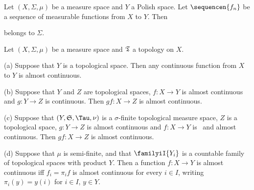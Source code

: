  Let $(X,\Sigma,\mu)$ be a measure space and
$Y$ a Polish space.   Let $\sequencen{f_n}$ be a
sequence of measurable functions from $X$ to $Y$.   Then


\noindent belongs to $\Sigma$.


 Let $(X,\Sigma,\mu)$ be a measure space and
$\frak T$ a topology on $X$.

(a) Suppose that $Y$ is a topological space.   Then any continuous
function from $X$ to $Y$ is almost continuous.

(b) Suppose that $Y$ and $Z$ are topological spaces, $f:X\to Y$ is
almost continuous and $g:Y\to Z$ is continuous.   Then $gf:X\to Z$ is
almost continuous.

(c) Suppose that $(Y,\frak S,\Tau,\nu)$ is a $\sigma$-finite topological
measure space, $Z$ is a topological space, $g:Y\to Z$ is almost
continuous and $f:X\to Y$ is \imp\ and almost continuous.   Then
$gf:X\to Z$ is almost continuous.

(d) Suppose that $\mu$ is semi-finite, and that $\familyiI{Y_i}$ is a
countable family of topological spaces with product $Y$.   Then a
function $f:X\to Y$
is almost continuous iff $f_i=\pi_if$ is almost continuous for every
$i\in I$, writing $\pi_i(y)=y(i)$ for $i\in I$, $y\in Y$.

